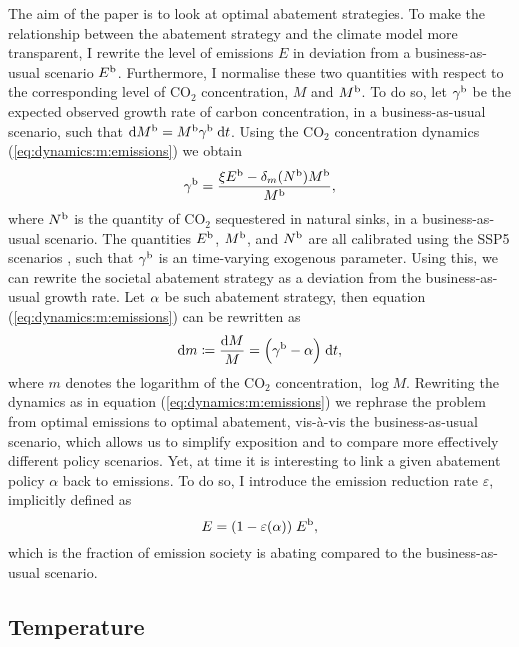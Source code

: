 \documentclass[../../main.tex]{subfiles}
\begin{document}
The aim of the paper is to look at optimal abatement strategies. To make the relationship between the abatement strategy and the climate model more transparent, I rewrite the level of emissions $E$ in deviation from a business-as-usual scenario $E^{\mathrm{b}}$. Furthermore, I normalise these two quantities with respect to the corresponding level of CO$_2$ concentration, $M$ and $M^{\mathrm{b}}$. To do so, let $\gamma^{\mathrm{b}}$ be the expected observed growth rate of carbon concentration, in a business-as-usual scenario, such that $\mathrm{d}M^{\mathrm{b}} = M^{\mathrm{b}} \gamma^{\mathrm{b}} \; \mathrm{d}t$. Using the CO$_2$ concentration dynamics (\ref{eq:dynamics:m:emissions}) we obtain \begin{equation} \label{eq:growth-rate-bau}
    \gamma^{\mathrm{b}} = \frac{\xi E^{\mathrm{b}} - \delta_m(N^{\mathrm{b}}) M^{\mathrm{b}}}{M^{\mathrm{b}}},
\end{equation} where $N^{\mathrm{b}}$ is the quantity of CO$_2$ sequestered in natural sinks, in a business-as-usual scenario. The quantities $E^{\mathrm{b}}$, $M^{\mathrm{b}}$, and $N^{\mathrm{b}}$ are all calibrated using the SSP5 scenarios \citep{intergovernmental_panel_on_climate_change_climate_2023}, such that $\gamma^{\mathrm{b}}$ is an time-varying exogenous parameter. Using this, we can rewrite the societal abatement strategy as a deviation from the business-as-usual growth rate. Let $\alpha$ be such abatement strategy, then equation (\ref{eq:dynamics:m:emissions}) can be rewritten as \begin{equation} \label{eq:dynamics:m:abatement}
    \mathrm{d}m \coloneqq \frac{\mathrm{d}M}{M} = \Big( \gamma^{\mathrm{b}} - \alpha \Big)\; \mathrm{d}t,
\end{equation} where $m$ denotes the logarithm of the CO$_2$ concentration, $\log M$. Rewriting the dynamics as in equation (\ref{eq:dynamics:m:emissions}) we rephrase the problem from optimal emissions to optimal abatement, vis-à-vis the business-as-usual scenario, which allows us to simplify exposition and to compare more effectively different policy scenarios. Yet, at time it is interesting to link a given abatement policy $\alpha$ back to emissions. To do so, I introduce the emission reduction rate $\varepsilon$, implicitly defined as \begin{equation} \label{eq:emission-reduction-rate}
    E = (1 - \varepsilon(\alpha)) \; E^{\mathrm{b}},
\end{equation} which is the fraction of emission society is abating compared to the business-as-usual scenario.

\subsection{Temperature}
\end{document}

